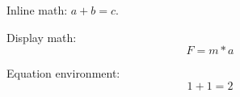 
Inline math: $a + b = c$.

Display math:
\[
F = m * a
\]

Equation environment:
\begin{equation}
1 + 1 = 2
\end{equation}

